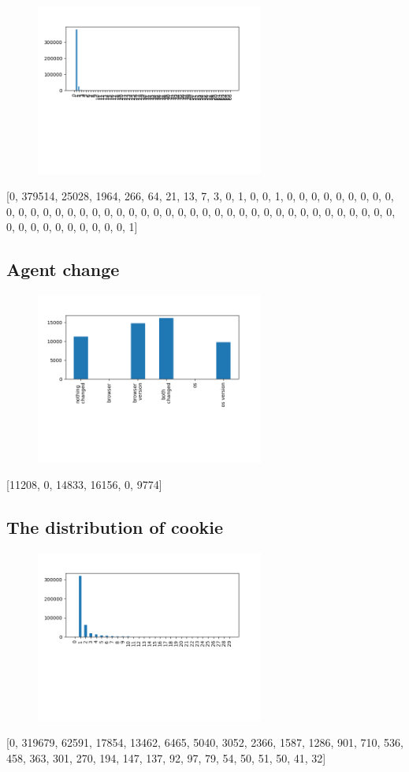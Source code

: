 \documentclass[10pt, conference, compsocconf]{IEEEtran}
\begin{document}
\begin{figure}[H]\centering\includegraphics[width=75mm,scale=0.5]{BasedonClientIDnumdevice}\end{figure}[0, 379514, 25028, 1964, 266, 64, 21, 13, 7, 3, 0, 1, 0, 0, 1, 0, 0, 0, 0, 0, 0, 0, 0, 0, 0, 0, 0, 0, 0, 0, 0, 0, 0, 0, 0, 0, 0, 0, 0, 0, 0, 0, 0, 0, 0, 0, 0, 0, 0, 0, 0, 0, 0, 0, 0, 0, 0, 0, 0, 0, 0, 0, 0, 0, 0, 0, 1]\subsection{Agent change}
\begin{figure}[H]\centering\includegraphics[width=75mm,scale=0.5]{BasedonClientIDagentdis}\end{figure}[11208, 0, 14833, 16156, 0, 9774]\subsection{The distribution of cookie}
\begin{figure}[H]\centering\includegraphics[width=75mm,scale=0.5]{BasedonClientIDcookiedis}\end{figure}[0, 319679, 62591, 17854, 13462, 6465, 5040, 3052, 2366, 1587, 1286, 901, 710, 536, 458, 363, 301, 270, 194, 147, 137, 92, 97, 79, 54, 50, 51, 50, 41, 32]
\end{document}
